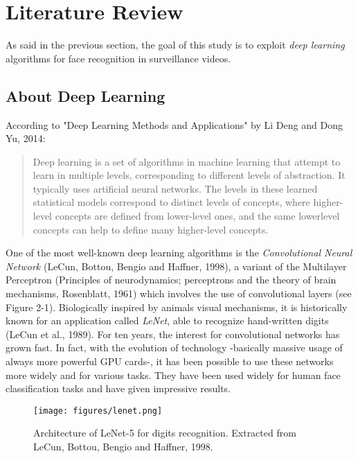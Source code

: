 \setlength{\footskip}{8mm}

\chapter{Literature Review} 
\protect\label{ch:literature-review}

As said in the previous section, the goal of this study is to exploit \textit{deep learning} algorithms for face recognition in surveillance videos.\\

\section{About Deep Learning}
\protect\label{Main-keywords-of-the-topic}
According to "Deep Learning Methods and Applications" by Li Deng and Dong Yu, 2014:

\blockquote{Deep learning is a set of algorithms in machine
learning that attempt to learn in multiple levels, corresponding
to different levels of abstraction. It typically uses artificial
neural networks. The levels in these learned statistical models
correspond to distinct levels of concepts, where higher-level concepts
are defined from lower-level ones, and the same lowerlevel
concepts can help to define many higher-level concepts.}

One of the most well-known deep learning algorithms is the \textit{Convolutional Neural Network} (LeCun, Bottou, Bengio and Haffner, 1998), a variant of the Multilayer Perceptron (Principles of neurodynamics; perceptrons and the theory of brain mechanisms, Rosenblatt, 1961) which involves the use of convolutional layers (see Figure 2-1). Biologically inspired by animals visual mechanisms, it is historically known for an application called \textit{LeNet}, able to recognize hand-written digits (LeCun et al., 1989). For ten years, the interest for convolutional networks has grown fast. In fact, with the evolution of technology -basically massive usage of always more powerful GPU cards-, it has been possible to use these networks more widely and for various tasks. They have been used widely for human face classification tasks and have given impressive results.

\begin{figure}[!ht]
  \centering
  \texttt{[image: figures/lenet.png]}  
  \caption[Architecture of LeNet-5 for digits recognition. Extracted from LeCun, Bottou, Bengio and Haffner, 1998.]{Architecture of LeNet-5 for digits recognition. Extracted from LeCun, Bottou, Bengio and Haffner, 1998.}
  \protect\label{fig:lenet}
\end{figure}

